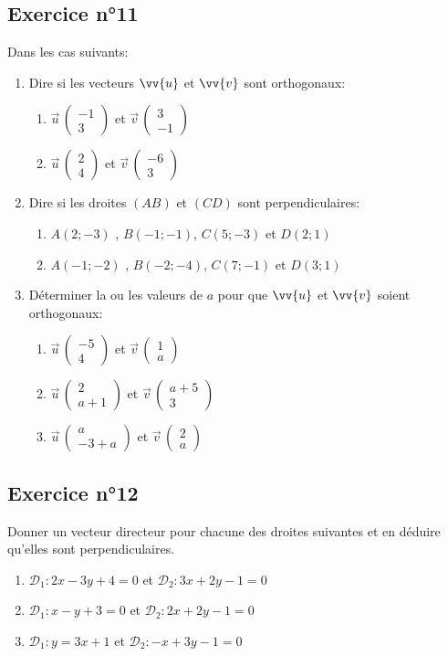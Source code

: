 \documentclass[12pt,a4paper]{article}
\newcommand*{\Coord}[3]{%
  \ensuremath{\overrightarrow{#1}\, 
    \begin{pmatrix} 
      #2\\ 
      #3 
    \end{pmatrix}}}
\begin{document}
\subsection*{Exercice n°11} 
Dans les cas suivants:

\begin{enumerate}
    \item Dire si les vecteurs $\vv{u}$ et $\vv{v}$ sont orthogonaux:
    \begin{enumerate}
        \item $\Coord{u}{-1}{3}$ et $\Coord{v}{3}{-1}$
        \item $\Coord{u}{2}{4}$ et $\Coord{v}{-6}{3}$
    \end{enumerate}
    \item Dire si les droites $(AB)$ et $(CD)$ sont perpendiculaires:
    \begin{enumerate}
        \item $A(2;-3)$ , $B(-1;-1)$, $C(5;-3)$ et $D(2;1)$
        \item $A(-1;-2)$ , $B(-2;-4)$, $C(7;-1)$ et $D(3;1)$
    \end{enumerate}
    \item Déterminer la ou les valeurs de $a$ pour que $\vv{u}$ et $\vv{v}$ soient orthogonaux:
    \begin{enumerate}
        \item $\Coord{u}{-5}{4}$ et $\Coord{v}{1}{a}$
        \item $\Coord{u}{2}{a+1}$ et $\Coord{v}{a+5}{3}$
        \item $\Coord{u}{a}{-3+a}$ et $\Coord{v}{2}{a}$
    \end{enumerate}
\end{enumerate}

\newpage
\subsection*{Exercice n°12} 

Donner un vecteur directeur pour chacune des droites suivantes et en déduire qu'elles sont perpendiculaires.

\begin{enumerate}
    \item $\mathscr{D}_{1}:2x-3y+4=0$ et $\mathscr{D}_2:3x+2y-1=0$
    \item $\mathscr{D}_{1}:x-y+3=0$ et $\mathscr{D}_2:2x+2y-1=0$
    \item $\mathscr{D}_{1}:y=3x+1$ et $\mathscr{D}_2:-x+3y-1=0$
\end{enumerate}
\end{document}
